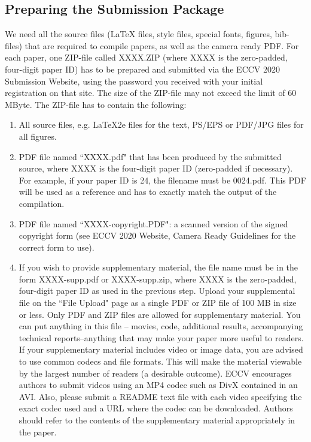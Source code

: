 \documentclass[runningheads]{llncs}
\begin{document}
\subsection{Preparing the Submission Package}
We need all the source files (LaTeX files, style files, special fonts, figures, bib-files) that are required to compile papers, as well as the camera ready PDF. For each paper, one ZIP-file called XXXX.ZIP (where XXXX is the zero-padded, four-digit paper ID) has to be prepared and submitted via the ECCV 2020 Submission Website, using the password you received with your initial registration on that site. The size of the ZIP-file may not exceed the limit of 60 MByte. The ZIP-file has to contain the following:
  \begin{enumerate}
 \item  All source files, e.g. LaTeX2e files for the text, PS/EPS or PDF/JPG files for all figures.
 \item PDF file named ``XXXX.pdf" that has been produced by the submitted source, where XXXX is the four-digit paper ID (zero-padded if necessary). For example, if your paper ID is 24, the filename must be 0024.pdf. This PDF will be used as a reference and has to exactly match the output of the compilation.
 \item PDF file named ``XXXX-copyright.PDF": a scanned version of the signed copyright form (see ECCV 2020 Website, Camera Ready Guidelines for the correct form to use). 
 \item If you wish to provide supplementary material, the file name must be in the form XXXX-supp.pdf or XXXX-supp.zip, where XXXX is the zero-padded, four-digit paper ID as used in the previous step. Upload your supplemental file on the ``File Upload" page as a single PDF or ZIP file of 100 MB in size or less. Only PDF and ZIP files are allowed for supplementary material. You can put anything in this file – movies, code, additional results, accompanying technical reports–anything that may make your paper more useful to readers.  If your supplementary material includes video or image data, you are advised to use common codecs and file formats.  This will make the material viewable by the largest number of readers (a desirable outcome). ECCV encourages authors to submit videos using an MP4 codec such as DivX contained in an AVI. Also, please submit a README text file with each video specifying the exact codec used and a URL where the codec can be downloaded. Authors should refer to the contents of the supplementary material appropriately in the paper.
 \end{enumerate}
\end{document}
